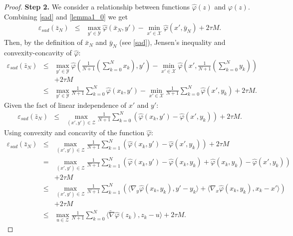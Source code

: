 \documentclass[runningheads]{llncs}
\begin{document}
\begin{proof}
\textbf{Step 2.} 
We consider a relationship between functions $\hat{\varphi}(z)$ and $\varphi(z)$. 
Combining \eqref{sad} and \eqref{lemma1_0} we get
\begin{eqnarray*}
    \varepsilon_{sad}(\bar z_N) 
    &\le& \max\limits_{y' \in \mathcal{Y}} \hat{\varphi}(\bar x_N, y') - \min\limits_{x' \in \mathcal{X}} \hat{\varphi}(x', \bar y_N) + 2\tau M. 
\end{eqnarray*}
Then, by the definition of $\bar x_N$ and $\bar y_N$ (see \eqref{sad}), Jensen's inequality and convexity-concavity of $\hat{\varphi}$:
\begin{eqnarray*}
    \varepsilon_{sad}(\bar z_N)
    &\leq& \max\limits_{y' \in \mathcal{Y}} \hat{\varphi}\left(\frac{1}{N+1} \left(\sum^N_{k = 0}  x_k\right) , y'\right) - \min\limits_{x' \in \mathcal{X}} \hat{\varphi}\left(x', \frac{1}{N+1} \left(\sum^N_{k = 0} y_k \right)\right) \nonumber \\
    &&+ 2\tau M
    \nonumber \\
    &\leq& \max\limits_{y' \in \mathcal{Y}} \frac{1}{N+1} \sum^N_{k = 0} \hat{\varphi}(x_k, y')  - \min\limits_{x' \in \mathcal{X}} \frac{1}{N+1} \sum^N_{k = 0} \hat{\varphi}(x', y_k) + 2\tau M.
\end{eqnarray*}
Given the fact of linear independence of $x'$ and $y'$:
\begin{eqnarray*}
    \varepsilon_{sad}(\bar z_N) &\leq& \max\limits_{(x', y') \in \mathcal{Z}}\frac{1}{N+1} \sum^N_{k = 0}  \left(\hat{\varphi}(x_k, y')  - \hat{\varphi}(x', y_k) \right) + 2\tau M.
\end{eqnarray*}
Using convexity and concavity of the function $\hat{\varphi}$:
\begin{eqnarray}
\label{temp8}
    \varepsilon_{sad}(\bar z_N) &\leq&  \max\limits_{(x', y') \in \mathcal{Z}}\frac{1}{N+1} \sum^N_{k = 1}  \left(\hat{\varphi}(x_k, y')  - \hat{\varphi}(x', y_k) \right) + 2\tau M  \nonumber \\
    &= & \max\limits_{(x', y') \in \mathcal{Z}} \frac{1}{N+1} \sum^N_{k = 1} \left(\hat{\varphi}(x_k, y') - \hat{\varphi}(x_k, y_k) + \hat{\varphi}(x_k, y_k) - \hat{\varphi}(x', y_k) \right) \nonumber \\
    &&+ 2\tau M  \nonumber \\
    &\leq& \max\limits_{(x', y') \in \mathcal{Z}} \frac{1}{N+1} \sum^N_{k = 1} \left(\langle \nabla_y \hat{\varphi} (x_k, y_k), y'-y_k \rangle + \langle \nabla_x \hat{\varphi} (x_k, y_k), x_k-x' \rangle \right) \nonumber \\
    &&+ 2\tau M \nonumber \\
    &\leq& \max\limits_{u \in \mathcal{Z}} \frac{1}{N+1} \sum^N_{k = 0}  \langle \tilde \nabla \hat{\varphi}(z_k), z_k - u\rangle  + 2\tau M.
\end{eqnarray}


\end{proof}
\end{document}
